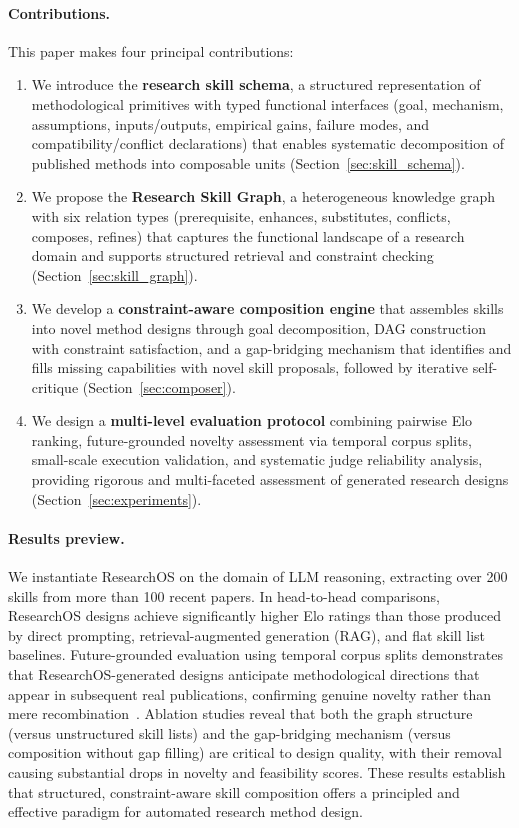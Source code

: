 \paragraph{Contributions.}
This paper makes four principal contributions:
\begin{enumerate}[nosep,leftmargin=*]
  \item We introduce the \textbf{research skill schema}, a structured
  representation of methodological primitives with typed functional interfaces
  (goal, mechanism, assumptions, inputs/outputs, empirical gains, failure
  modes, and compatibility/conflict declarations) that enables systematic
  decomposition of published methods into composable units
  (Section~\ref{sec:skill_schema}).

  \item We propose the \textbf{Research Skill Graph}, a heterogeneous
  knowledge graph with six relation types (prerequisite, enhances, substitutes,
  conflicts, composes, refines) that captures the functional landscape of a
  research domain and supports structured retrieval and constraint
  checking (Section~\ref{sec:skill_graph}).

  \item We develop a \textbf{constraint-aware composition engine} that
  assembles skills into novel method designs through goal decomposition,
  DAG construction with constraint satisfaction, and a gap-bridging mechanism
  that identifies and fills missing capabilities with novel skill proposals,
  followed by iterative self-critique
  (Section~\ref{sec:composer}).

  \item We design a \textbf{multi-level evaluation protocol} combining
  pairwise Elo ranking, future-grounded novelty assessment via temporal
  corpus splits, small-scale execution validation, and systematic judge
  reliability analysis, providing rigorous and multi-faceted assessment of
  generated research designs (Section~\ref{sec:experiments}).
\end{enumerate}

\paragraph{Results preview.}
We instantiate ResearchOS on the domain of LLM reasoning, extracting over 200
skills from more than 100 recent papers. In head-to-head comparisons,
ResearchOS designs achieve significantly higher Elo ratings than those produced
by direct prompting, retrieval-augmented generation (RAG), and flat skill list
baselines. Future-grounded evaluation using temporal corpus splits
demonstrates that ResearchOS-generated designs anticipate methodological
directions that appear in subsequent real publications, confirming genuine
novelty rather than mere recombination~\cite{du2024hindisight}. Ablation
studies reveal that both the graph structure (versus unstructured skill lists)
and the gap-bridging mechanism (versus composition without gap filling) are
critical to design quality, with their removal causing substantial drops in
novelty and feasibility scores. These results establish that structured,
constraint-aware skill composition offers a principled and effective paradigm
for automated research method design.
